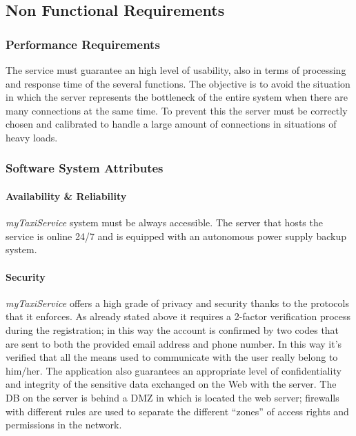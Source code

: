 \documentclass[a4paper,11pt]{report} %
\newcommand{\mts}{\mbox{\normalfont\itshape myTaxiService}}
\begin{document}
	\pagebreak
		
	\subsection{Non Functional Requirements}
	
	\subsubsection{Performance Requirements} The service must guarantee an high level of usability, also in terms of processing and response time of the several functions. The objective is to avoid the situation in which the server represents the bottleneck of the entire system when there are many connections at the same time. To prevent this the server must be correctly chosen and calibrated to handle a large amount of connections in situations of heavy loads. 
	
%		
%	
%	
	\subsubsection{Software System Attributes}
	
	\paragraph{Availability \& Reliability} \mts{} system must be always accessible. The server that hosts the service is online 24/7 and is equipped with an autonomous power supply backup system.
	
	\paragraph{Security} \mts{} offers a high grade of privacy and security thanks to the protocols that it enforces. As already stated above it requires a 2-factor verification process during the registration; in this way the account is confirmed by two codes that are sent to both the provided email address and phone number. In this way it's verified that  all the means used to communicate with the user really belong to him/her. The application also guarantees an appropriate level of confidentiality and integrity of the sensitive data exchanged on the Web with the server. The DB on the server is behind a DMZ in which is located the web server; firewalls with different rules are used to separate the different ``zones'' of access rights and permissions in the network.
	
\end{document}
